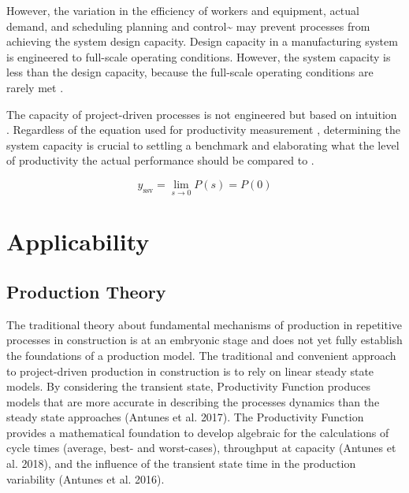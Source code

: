 \documentclass{article}
\begin{document}
\begin{enumerate}
However, the variation in the efficiency of workers and equipment, actual demand, and scheduling planning and control\textasciitilde{}\cite[p.54]{Kumar2009} may prevent processes from achieving the system design capacity.
Design capacity in a manufacturing system is engineered to full-scale operating conditions.
However, the system capacity is less than the design capacity, because the full-scale operating conditions are rarely met \citep{Kumar2009}.

The capacity of project-driven processes is not engineered but based on intuition \citep{McCray2002,ProjectManagementInstitute2011}.
Regardless of the equation used for productivity measurement \citep{Thomas1990}, determining the system capacity is crucial to settling a benchmark and elaborating what the level of productivity the actual performance should be compared to \citep{Abdel-Razek2007,Olomolaiye1998,Zhao2014}.



\begin{equation}\label{eq:Capacity}
	y_{\mbox{ssv}} = \lim_{s \rightarrow 0} P(s) = P(0)
\end{equation}
\end{enumerate}


\section{Applicability}
\label{sec:org0081eb2}
\subsection{Production Theory}
\label{sec:org4919d75}
The traditional theory about fundamental mechanisms of production in repetitive processes in construction is at an embryonic stage and does not yet fully establish the foundations of a production model.
The traditional and convenient approach to project-driven production in construction is to rely on linear steady state models.
By considering the transient state, Productivity Function produces models that are more accurate in describing the processes dynamics than the steady state approaches (Antunes et al. 2017).
The Productivity Function provides a mathematical foundation to develop algebraic for the calculations of cycle times (average, best- and worst-cases), throughput at capacity (Antunes et al. 2018), and the influence of the transient state time in the production variability (Antunes et al. 2016).
\end{document}
